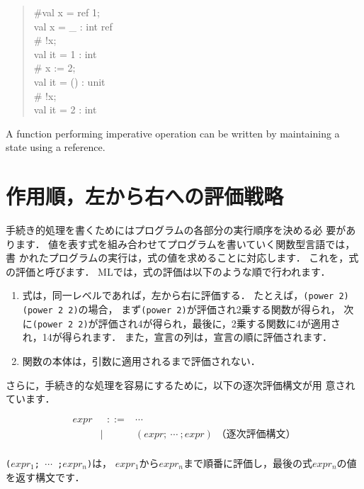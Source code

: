 \documentclass{jbook}
\newif\ifjp
\newcommand{\txt}[2]{#1}
\begin{document}
\begin{tt}
\begin{quote}
\#val x = ref 1;\\
val x = \_ : int ref\\
\# !x;\\
val it = 1 : int\\
\# x := 2;\\
val it = () : unit\\
\# !x;\\
val it = 2 : int
\end{quote}
\end{tt}
	A function performing imperative operation can be written by
maintaining a state using a reference.
\fi%

\section{
\txt{作用順，左から右への評価戦略}
    {Left-to-right applicative order evaluation}
}
\label{sec:tutorialEvalorder}

\ifjp%
	手続き的処理を書くためにはプログラムの各部分の実行順序を決める必
要があります．
	値を表す式を組み合わせてプログラムを書いていく関数型言語では，書
かれたプログラムの実行は，式の値を求めることに対応します．
	これを，式の評価と呼びます．
	MLでは，式の評価は以下のような順で行われます．
\begin{enumerate}
\item 式は，同一レベルであれば，左から右に評価する．
	たとえば，{\tt (power 2) (power 2 2)}の場合，
まず{\tt (power 2)}が評価され2乗する関数が得られ，
次に{\tt (power 2 2)}が評価され4が得られ，最後に，2乗する関数に4が適用さ
れ，14が得られます．
	また，宣言の列は，宣言の順に評価されます．
\item 関数の本体は，引数に適用されるまで評価されない．
\end{enumerate}
	さらに，手続き的な処理を容易にするために，以下の逐次評価構文が用
意されています．
\begin{tt}
\begin{eqnarray*}
expr &\mbox{\ \ }::=& \cdots\\
     &|& (expr;{\ }\cdots{\ };expr)   \mbox{\ \ \ \ （逐次評価構文）} \\
\end{eqnarray*}
\end{tt}
{\tt ($expr_1$;{\ }$\cdots${\ };$expr_n$)}は，
$expr_1$から$expr_n$まで順番に評価し，最後の式$expr_n$の値を返す構文です．
\end{document}
